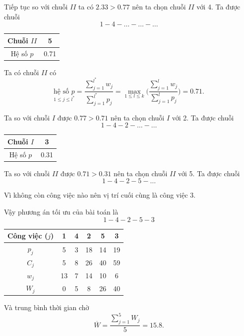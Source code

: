 \begin{vd}
Tiếp tục so với chuỗi $II$ ta có $2.33>0.77$ nên ta chọn chuỗi $II$ với 4.
Ta được chuỗi $$1-4-\ldots-\ldots-\ldots$$

\begin{table}[h!]
	\centering
	\begin{tabular}{|c | c |} 
	\hline
	Chuỗi $II$ & 5 \\
	\hline\hline
	Hệ số $p$ & 0.71 \\
	\hline
	\end{tabular}
\end{table}

Ta có chuỗi $II$ có $$
	\underset{1 \leq j \leq l^*}{\text{hệ số }p}= \frac{\sum_{j=1}^{l^*}w_j}{\sum_{j=1}^{l^*}p_j} = \underset{1 \leq l \leq k}{\max}\Biggl(\frac{\sum_{j=1}^{l}w_j}{\sum_{j=1}^{l}p_j}\Biggl)=0.71.$$

Ta so với chuỗi $I$ được $0.77>0.71$ nên ta chọn chuỗi $I$ với 2. Ta được chuỗi $$1-4-2-\ldots-\ldots$$

\begin{table}[h!]
	\centering
	\begin{tabular}{|c | c |} 
	\hline
	Chuỗi $I$ & 3 \\
	\hline\hline
	Hệ số $p$ & 0.31 \\
	\hline
	\end{tabular}
\end{table}
Ta so với chuỗi $II$ được $0.71>0.31$ nên ta chọn chuỗi $II$ với 5. Ta được chuỗi $$1-4-2-5-\ldots$$

Vì không còn công việc nào nên vị trí cuối cùng là công việc 3.

Vậy phương án tối ưu của bài toán là $$1-4-2-5-3$$

\begin{table}[h!]
	\centering
	\begin{tabular}{|c | c c c c c |} 
	\hline
	Công việc ($j$) & 1 & 4 & 2 & 5 & 3 \\
	\hline\hline
	$p_j$ & 5 & 3 & 18 & 14 & 19 \\
	$C_j$ & 5 & 8 & 26 & 40 & 59 \\
	$w_j$ & 13 & 7 & 14 & 10 & 6 \\
	$W_j$ & 0 & 5 & 8 & 26 & 40 \\
	\hline
	\end{tabular}
\end{table}

Và trung bình thời gian chờ
\begin{equation*}
\overline{W} = \frac{\sum_{j=1}^5 W_j}{5} = 15.8.
\end{equation*}

\end{vd}



































